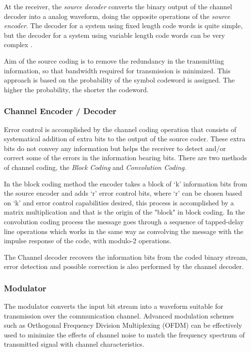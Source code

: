 At the receiver, the \emph{source decoder} converts the binary output of the
channel decoder into a analog waveform, doing the opposite operations of the
\emph{source encoder}. The decoder for a system using fixed length code words is
quite simple, but the decoder for a system using variable length code words can
be very complex \cite{ocw:digicomm}.

Aim of the source coding is to remove the redundancy in the transmitting
information, so that bandwidth required for transmission is minimized. This
approach is based on the probability of the symbol codeword is assigned. The
higher the probability, the shorter the codeword.

\subsubsection{Channel Encoder / Decoder}

Error control is accomplished by the channel coding operation that consists of
systematical addition of extra bits to the output of the source coder. These
extra bits do not convey any information but helps the receiver to detect and/or
correct some of the errors in the information bearing bits. There are two
methods of channel coding, the \textit{Block Coding} and \textit{Convolution
Coding}.

In the block coding method the encoder takes a block of ‘k’ information bits
from the source encoder and adds ‘r’ error control bits, where ‘r’ can be chosen
based on ‘k’ and error control capabilities desired, this process is
accomplished by a matrix multiplication and that is the origin of the "block" in
block coding. In the convolution coding process the message goes through a
sequence of tapped-delay line operations which works in the same way as
convolving the message with the impulse response of the code, with modulo-2
operations.

The Channel decoder recovers the information bits from the coded binary stream,
error detection and possible correction is also performed by the channel
decoder.

\subsubsection{Modulator}

The modulator converts the input bit stream into a waveform suitable for
transmission over the communication channel. Advanced modulation schemes such as
Orthogonal Frequency Division Multiplexing (OFDM) can be effectively used to
minimize the effects of channel noise to match the frequency spectrum of
transmitted signal with channel characteristics.

